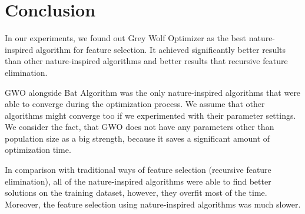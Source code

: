 \documentclass[runningheads]{llncs}
\begin{document}

\section{Conclusion}


In our experiments, we found out Grey Wolf Optimizer as the best nature-inspired algorithm for feature selection. It achieved significantly better results than other nature-inspired algorithms and better results that recursive feature elimination.

GWO alongside Bat Algorithm was the only nature-inspired algorithms that were able to converge during the optimization process. We assume that other algorithms might converge too if we experimented with their parameter settings. We consider the fact, that GWO does not have any parameters other than population size as a big strength, because it saves a significant amount of optimization time.

In comparison with traditional ways of feature selection (recursive feature elimination), all of the nature-inspired algorithms were able to find better solutions on the training dataset, however, they overfit most of the time. Moreover, the feature selection using nature-inspired algorithms was much slower.



\end{document}
